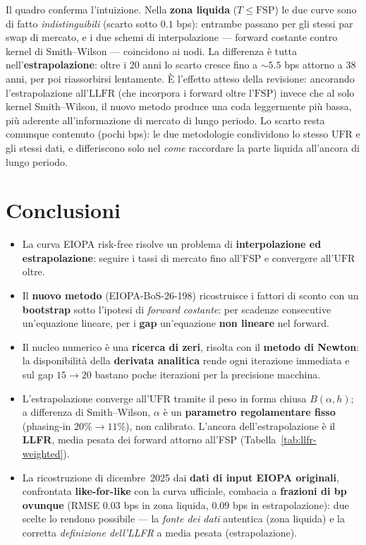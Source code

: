 \documentclass[11pt,a4paper]{article}
\theoremstyle{plain}
\theoremstyle{definition}
\theoremstyle{remark}
\newcommand{\UFR}{\mathrm{UFR}}
\newcommand{\LLFR}{\mathrm{LLFR}}
\newcommand{\FSP}{\mathrm{FSP}}
\begin{document}
Il quadro conferma l'intuizione. Nella \textbf{zona liquida} ($T\le\FSP$) le due curve sono
di fatto \emph{indistinguibili} (scarto sotto $0.1$ bps): entrambe passano per gli stessi par
swap di mercato, e i due schemi di interpolazione --- forward costante contro kernel di
Smith--Wilson --- coincidono ai nodi. La differenza \`e tutta nell'\textbf{estrapolazione}: oltre
i 20 anni lo scarto cresce fino a $\sim\!5.5$ bps attorno a 38 anni, per poi riassorbirsi
lentamente. \`E l'effetto atteso della revisione: ancorando l'estrapolazione all'$\LLFR$ (che
incorpora i forward oltre l'$\FSP$) invece che al solo kernel Smith--Wilson, il nuovo metodo
produce una coda leggermente pi\`u bassa, pi\`u aderente all'informazione di mercato di lungo
periodo. Lo scarto resta comunque contenuto (pochi bps): le due metodologie condividono lo
stesso $\UFR$ e gli stessi dati, e differiscono solo nel \emph{come} raccordare la parte liquida
all'ancora di lungo periodo.

\section{Conclusioni}
\label{sec:conclusioni}

\begin{itemize}
  \item La curva EIOPA risk-free risolve un problema di \textbf{interpolazione ed
        estrapolazione}: seguire i tassi di mercato fino all'FSP e convergere all'$\UFR$ oltre.
  \item Il \textbf{nuovo metodo} (EIOPA-BoS-26-198) ricostruisce i fattori di sconto con un
        \textbf{bootstrap} sotto l'ipotesi di \emph{forward costante}: per scadenze consecutive
        un'equazione lineare, per i \textbf{gap} un'equazione \textbf{non lineare} nel forward.
  \item Il nucleo numerico \`e una \textbf{ricerca di zeri}, risolta con il \textbf{metodo di
        Newton}: la disponibilit\`a della \textbf{derivata analitica} rende ogni iterazione
        immediata e sul gap $15\!\to\!20$ bastano poche iterazioni per la precisione macchina.
  \item L'estrapolazione converge all'$\UFR$ tramite il peso in forma chiusa $B(\alpha,h)$;
        a differenza di Smith--Wilson, $\alpha$ \`e un \textbf{parametro regolamentare fisso}
        (phasing-in $20\%\!\to\!11\%$), non calibrato. L'ancora dell'estrapolazione \`e il
        \textbf{LLFR}, media pesata dei forward attorno all'FSP (Tabella~\ref{tab:llfr-weighted}).
  \item La ricostruzione di dicembre~2025 dai \textbf{dati di input EIOPA originali}, confrontata
        \textbf{like-for-like} con la curva ufficiale, combacia a \textbf{frazioni di bp
        ovunque} (RMSE $0.03$ bps in zona liquida, $0.09$ bps in estrapolazione): due scelte lo
        rendono possibile --- la \emph{fonte dei dati} autentica (zona liquida) e la corretta
        \emph{definizione dell'LLFR} a media pesata (estrapolazione).
\end{itemize}
\end{document}

